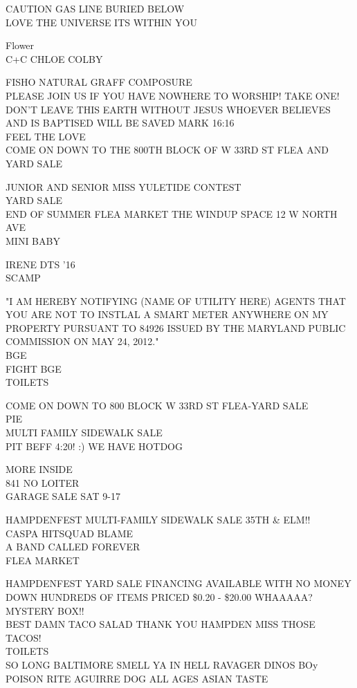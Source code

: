 \documentclass[10pt,letterpaper]{article}
\begin{document}
CAUTION GAS LINE BURIED BELOW\\
LOVE THE UNIVERSE ITS WITHIN YOU

Flower\\
C+C CHLOE COLBY

FISHO NATURAL GRAFF COMPOSURE\\
PLEASE JOIN US IF YOU HAVE NOWHERE TO WORSHIP!  TAKE ONE!  DON'T LEAVE THIS EARTH WITHOUT JESUS WHOEVER BELIEVES AND IS BAPTISED WILL BE SAVED MARK 16:16\\
FEEL THE LOVE\\
COME ON DOWN TO THE 800TH BLOCK OF W 33RD ST FLEA AND YARD SALE

JUNIOR AND SENIOR MISS YULETIDE CONTEST\\
YARD SALE\\
END OF SUMMER FLEA MARKET THE WINDUP SPACE 12 W NORTH AVE\\
MINI BABY

IRENE DTS '16\\
SCAMP

"I AM HEREBY NOTIFYING (NAME OF UTILITY HERE) AGENTS THAT YOU ARE NOT TO INSTLAL A SMART METER ANYWHERE ON MY PROPERTY PURSUANT TO 84926 ISSUED BY THE MARYLAND PUBLIC COMMISSION ON MAY 24, 2012."\\
BGE\\
FIGHT BGE\\
TOILETS

COME ON DOWN TO 800 BLOCK W 33RD ST FLEA{-}YARD SALE\\
PIE\\
MULTI FAMILY SIDEWALK SALE\\
PIT BEFF 4:20! :) WE HAVE HOTDOG

MORE INSIDE\\
841 NO LOITER\\
GARAGE SALE SAT 9{-}17

HAMPDENFEST MULTI{-}FAMILY SIDEWALK SALE 35TH \& ELM!!\\
CASPA HITSQUAD BLAME\\
A BAND CALLED FOREVER\\
FLEA MARKET

HAMPDENFEST YARD SALE FINANCING AVAILABLE WITH NO MONEY DOWN HUNDREDS OF ITEMS PRICED \$0.20 {-} \$20.00 WHAAAAA?  MYSTERY BOX!!\\
BEST DAMN TACO SALAD THANK YOU HAMPDEN MISS THOSE TACOS!\\
TOILETS\\
SO LONG BALTIMORE SMELL YA IN HELL RAVAGER DINOS BOy POISON RITE AGUIRRE DOG ALL AGES ASIAN TASTE
\end{document}
